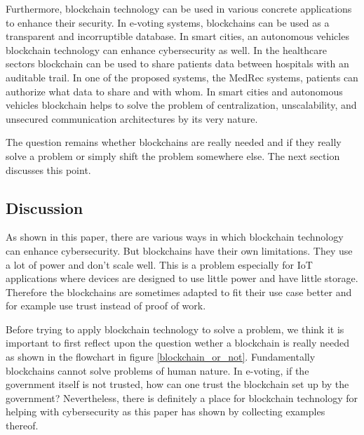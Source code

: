 Furthermore, blockchain technology can be used in various concrete applications to enhance their security.
In e-voting systems, blockchains can be used as a transparent and incorruptible database.
In smart cities, an autonomous vehicles blockchain technology can enhance cybersecurity as well.
In the healthcare sectors blockchain can be used to share patients data between hospitals with an auditable trail. In one of the proposed systems, the MedRec systems, patients can authorize what data to share and with whom.
In smart cities and autonomous vehicles blockchain helps to solve the problem of centralization, unscalability,
and unsecured communication architectures by its very nature.

The question remains whether blockchains are really needed and if they really solve a problem or simply shift the problem somewhere else. The next section discusses this point.

\subsection{Discussion}

As shown in this paper, there are various ways in which blockchain technology can enhance cybersecurity.
But blockchains have their own limitations. They use a lot of power and don't scale well. This is a problem especially for IoT applications where devices are designed to use little power and have little storage. Therefore the blockchains are sometimes adapted to fit their use case better and for example use trust instead of proof of work.

Before trying to apply blockchain technology to solve a problem, we think it is important to first reflect upon the question wether a blockchain is really needed as shown in the flowchart in figure \ref{blockchain_or_not}.
Fundamentally blockchains cannot solve problems of human nature. In e-voting, if the government itself is not trusted, how can one trust the blockchain set up by the government? Nevertheless, there is definitely a place for blockchain technology for helping with cybersecurity as this paper has shown by collecting examples thereof.









